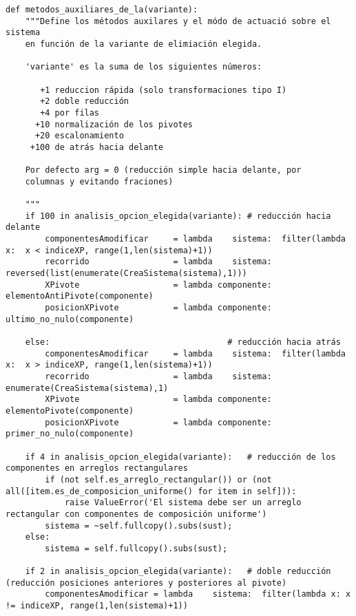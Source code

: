 \documentclass[11pt]{report}
\begin{document}
\begin{verbatim}
def metodos_auxiliares_de_la(variante):
    """Define los métodos auxilares y el módo de actuació sobre el sistema
    en función de la variante de elimiación elegida.

    'variante' es la suma de los siguientes números:
        
       +1 reduccion rápida (solo transformaciones tipo I)
       +2 doble reducción
       +4 por filas
      +10 normalización de los pivotes
      +20 escalonamiento
     +100 de atrás hacia delante
    
    Por defecto arg = 0 (reducción simple hacia delante, por
    columnas y evitando fraciones)

    """
    if 100 in analisis_opcion_elegida(variante): # reducción hacia delante
        componentesAmodificar     = lambda    sistema:  filter(lambda x:  x < indiceXP, range(1,len(sistema)+1))
        recorrido                 = lambda    sistema:  reversed(list(enumerate(CreaSistema(sistema),1)))
        XPivote                   = lambda componente:  elementoAntiPivote(componente)
        posicionXPivote           = lambda componente:  ultimo_no_nulo(componente)
                
    else:                                    # reducción hacia atrás
        componentesAmodificar     = lambda    sistema:  filter(lambda x:  x > indiceXP, range(1,len(sistema)+1))
        recorrido                 = lambda    sistema:  enumerate(CreaSistema(sistema),1)
        XPivote                   = lambda componente:  elementoPivote(componente)
        posicionXPivote           = lambda componente:  primer_no_nulo(componente)
        
    if 4 in analisis_opcion_elegida(variante):   # reducción de los componentes en arreglos rectangulares
        if (not self.es_arreglo_rectangular()) or (not all([item.es_de_composicion_uniforme() for item in self])):
            raise ValueError('El sistema debe ser un arreglo rectangular con componentes de composición uniforme')
        sistema = ~self.fullcopy().subs(sust);
    else:
        sistema = self.fullcopy().subs(sust);

    if 2 in analisis_opcion_elegida(variante):   # doble reducción (reducción posiciones anteriores y posteriores al pivote)
        componentesAmodificar = lambda    sistema:  filter(lambda x: x != indiceXP, range(1,len(sistema)+1))


\end{verbatim}
\end{document}
